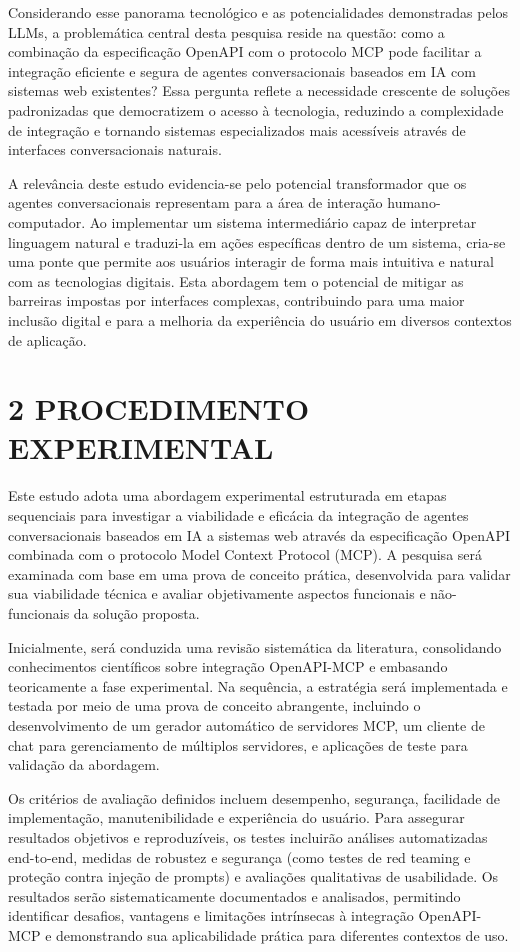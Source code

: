 \documentclass[
]{article}
\begin{document}
Considerando esse panorama tecnológico e as potencialidades demonstradas
pelos LLMs, a problemática central desta pesquisa reside na questão:
como a combinação da especificação OpenAPI com o protocolo MCP pode
facilitar a integração eficiente e segura de agentes conversacionais
baseados em IA com sistemas web existentes? Essa pergunta reflete a
necessidade crescente de soluções padronizadas que democratizem o acesso
à tecnologia, reduzindo a complexidade de integração e tornando sistemas
especializados mais acessíveis através de interfaces conversacionais
naturais.

A relevância deste estudo evidencia-se pelo potencial transformador que
os agentes conversacionais representam para a área de interação
humano-computador. Ao implementar um sistema intermediário capaz de
interpretar linguagem natural e traduzi-la em ações específicas dentro
de um sistema, cria-se uma ponte que permite aos usuários interagir de
forma mais intuitiva e natural com as tecnologias digitais. Esta
abordagem tem o potencial de mitigar as barreiras impostas por
interfaces complexas, contribuindo para uma maior inclusão digital e
para a melhoria da experiência do usuário em diversos contextos de
aplicação.

\section{2 PROCEDIMENTO EXPERIMENTAL}\label{procedimento-experimental}

Este estudo adota uma abordagem experimental estruturada em etapas
sequenciais para investigar a viabilidade e eficácia da integração de
agentes conversacionais baseados em IA a sistemas web através da
especificação OpenAPI combinada com o protocolo Model Context Protocol
(MCP). A pesquisa será examinada com base em uma prova de conceito
prática, desenvolvida para validar sua viabilidade técnica e avaliar
objetivamente aspectos funcionais e não-funcionais da solução proposta.

Inicialmente, será conduzida uma revisão sistemática da literatura,
consolidando conhecimentos científicos sobre integração OpenAPI-MCP e
embasando teoricamente a fase experimental. Na sequência, a estratégia
será implementada e testada por meio de uma prova de conceito
abrangente, incluindo o desenvolvimento de um gerador automático de
servidores MCP, um cliente de chat para gerenciamento de múltiplos
servidores, e aplicações de teste para validação da abordagem.

Os critérios de avaliação definidos incluem desempenho, segurança,
facilidade de implementação, manutenibilidade e experiência do usuário.
Para assegurar resultados objetivos e reproduzíveis, os testes incluirão
análises automatizadas end-to-end, medidas de robustez e segurança (como
testes de red teaming e proteção contra injeção de prompts) e avaliações
qualitativas de usabilidade. Os resultados serão sistematicamente
documentados e analisados, permitindo identificar desafios, vantagens e
limitações intrínsecas à integração OpenAPI-MCP e demonstrando sua
aplicabilidade prática para diferentes contextos de uso.
\end{document}
